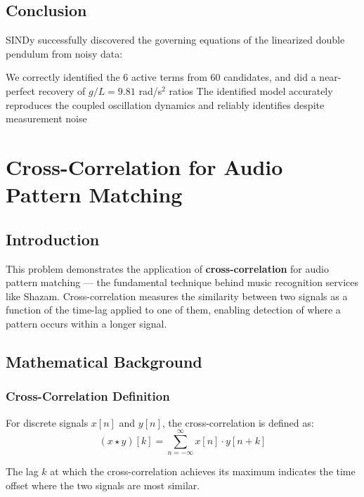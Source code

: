 \documentclass[12pt,a4paper]{article}
\begin{document}
\subsection{Conclusion}

SINDy successfully discovered the governing equations of the linearized double pendulum from noisy data:

We correctly identified the 6 active terms from 60 candidates, and did a near-perfect recovery of $g/L = 9.81$ rad/s$^2$ ratios
The identified model accurately reproduces the coupled oscillation dynamics and reliably identifies despite measurement noise

\newpage
\section{Cross-Correlation for Audio Pattern Matching}

\subsection{Introduction}

This problem demonstrates the application of \textbf{cross-correlation} for audio pattern matching --- the fundamental technique behind music recognition services like Shazam. Cross-correlation measures the similarity between two signals as a function of the time-lag applied to one of them, enabling detection of where a pattern occurs within a longer signal.

\subsection{Mathematical Background}

\subsubsection{Cross-Correlation Definition}

For discrete signals $x[n]$ and $y[n]$, the cross-correlation is defined as:
\begin{equation}
    (x \star y)[k] = \sum_{n=-\infty}^{\infty} x[n] \cdot y[n+k]
\end{equation}

The lag $k$ at which the cross-correlation achieves its maximum indicates the time offset where the two signals are most similar.
\end{document}
